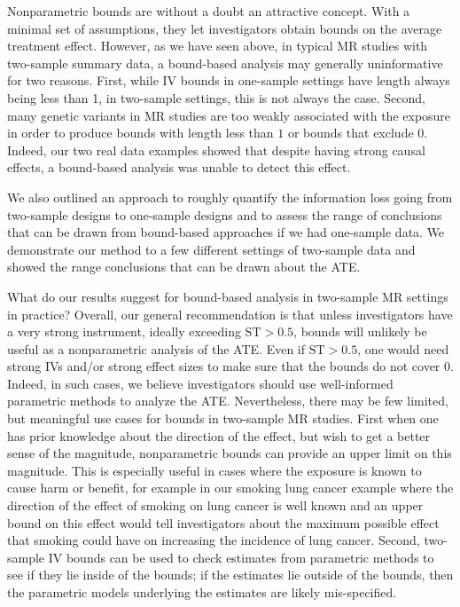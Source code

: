 \documentclass[
]{article}
\theoremstyle{plain}
\begin{document}
Nonparametric bounds are without a doubt an attractive concept. With a minimal set of assumptions, they let investigators obtain bounds on the average treatment effect. However, as we have seen above, in typical MR studies with two-sample summary data, a bound-based analysis may generally uninformative for two reasons. First, while IV bounds in one-sample settings have length always being less than 1, in two-sample settings, this is not always the case. Second, many genetic variants in MR studies are too weakly associated with the exposure in order to produce bounds with length less than \(1\) or bounds that exclude \(0\). Indeed, our two real data examples showed that despite having strong causal effects, a bound-based analysis was unable to detect this effect.

We also outlined an approach to roughly quantify the information loss going from two-sample designs to one-sample designs and to assess the range of conclusions that can be drawn from bound-based approaches if we had one-sample data. We demonstrate our method to a few different settings of two-sample data and showed the range conclusions that can be drawn about the ATE.

What do our results suggest for bound-based analysis in two-sample MR settings in practice? Overall, our general recommendation is that unless investigators have a very strong instrument, ideally exceeding \(\text{ST} > 0.5\), bounds will unlikely be useful as a nonparametric analysis of the ATE. Even if \(\text{ST} > 0.5\), one would need strong IVs and/or strong effect sizes to make sure that the bounds do not cover \(0\). Indeed, in such cases, we believe investigators should use well-informed parametric methods to analyze the ATE. Nevertheless, there may be few limited, but meaningful use cases for bounds in two-sample MR studies. First when one has prior knowledge about the direction of the effect, but wish to get a better sense of the magnitude, nonparametric bounds can provide an upper limit on this magnitude. This is especially useful in cases where the exposure is known to cause harm or benefit, for example in our smoking lung cancer example where the direction of the effect of smoking on lung cancer is well known and an upper bound on this effect would tell investigators about the maximum possible effect that smoking could have on increasing the incidence of lung cancer. Second, two-sample IV bounds can be used to check estimates from parametric methods to see if they lie inside of the bounds; if the estimates lie outside of the bounds, then the parametric models underlying the estimates are likely mis-specified.
\end{document}
